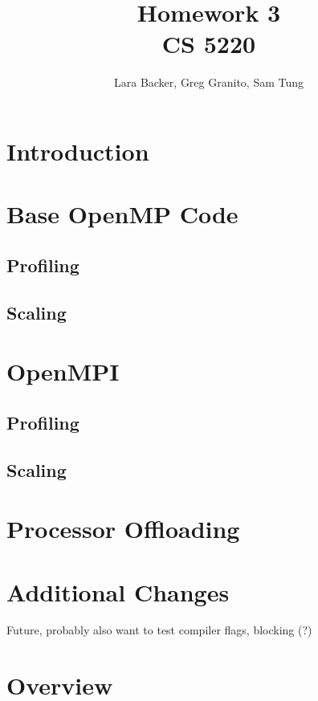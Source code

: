 \documentclass{article}
\begin{document}
\title{Homework 3 \\CS 5220}
\author{Lara Backer, Greg Granito, Sam Tung}

\maketitle

\section{Introduction}

\section{Base OpenMP Code}

\subsection{Profiling}
\subsection{Scaling}

\section{OpenMPI}

\subsection{Profiling}
\subsection{Scaling}

\section{Processor Offloading}

\section{Additional Changes}
Future, probably also want to test compiler flags, blocking (?)

\section{Overview}

\begin{thebibliography}{1}

\end{thebibliography}
\end{document}
